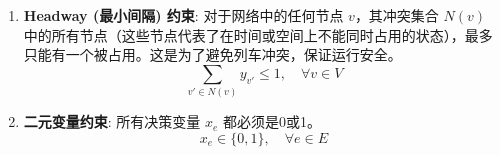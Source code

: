 \documentclass{article}
\begin{document}
\begin{enumerate}
        \item \textbf{Headway (最小间隔) 约束}:
        对于网络中的任何节点 $v$，其冲突集合 $N(v)$ 中的所有节点（这些节点代表了在时间或空间上不能同时占用的状态），最多只能有一个被占用。这是为了避免列车冲突，保证运行安全。
        \begin{equation}
            \sum_{v' \in N(v)} y_{v'} \le 1, \quad \forall v \in V\label{eq:con_headway}
        \end{equation}

        \item \textbf{二元变量约束}:
        所有决策变量 $x_e$ 都必须是0或1。
        \begin{equation}
            x_e \in \{0,1\}, \quad \forall e \in E\label{eq:con_binary}
        \end{equation}
    \end{enumerate}
\end{document}
